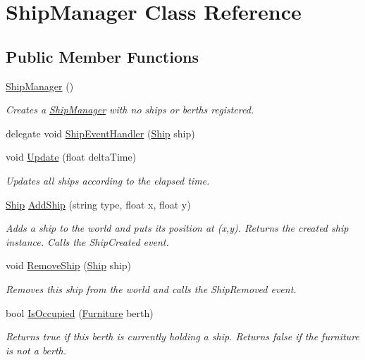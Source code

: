 \hypertarget{class_ship_manager}{}\section{Ship\+Manager Class Reference}
\label{class_ship_manager}
\subsection*{Public Member Functions}
\begin{DoxyCompactItemize}
\item 
\hyperlink{class_ship_manager_ac66c77a24cd7fe00ef4083a5eed322ac}{Ship\+Manager} ()
\begin{DoxyCompactList}\small\item\em Creates a \hyperlink{class_ship_manager}{Ship\+Manager} with no ships or berths registered. \end{DoxyCompactList}\item 
delegate void \hyperlink{class_ship_manager_a9dbbc387497ab2f4fc7c90cde65dfd4d}{Ship\+Event\+Handler} (\hyperlink{class_ship}{Ship} ship)
\item 
void \hyperlink{class_ship_manager_a4f54aabd64ef5b7e366e9dcbcffb1151}{Update} (float delta\+Time)
\begin{DoxyCompactList}\small\item\em Updates all ships according to the elapsed time. \end{DoxyCompactList}\item 
\hyperlink{class_ship}{Ship} \hyperlink{class_ship_manager_a5251a3f11c3d47796f97a541a1ed4c44}{Add\+Ship} (string type, float x, float y)
\begin{DoxyCompactList}\small\item\em Adds a ship to the world and puts its position at (x,y). Returns the created ship instance. Calls the Ship\+Created event. \end{DoxyCompactList}\item 
void \hyperlink{class_ship_manager_a8a9fa6ebfb1f8f059f1776d620658808}{Remove\+Ship} (\hyperlink{class_ship}{Ship} ship)
\begin{DoxyCompactList}\small\item\em Removes this ship from the world and calls the Ship\+Removed event. \end{DoxyCompactList}\item 
bool \hyperlink{class_ship_manager_a1a97c84b3ac0c958fbf1f11f9d04d16b}{Is\+Occupied} (\hyperlink{class_furniture}{Furniture} berth)
\begin{DoxyCompactList}\small\item\em Returns true if this berth is currently holding a ship. Returns false if the furniture is not a berth. \end{DoxyCompactList}\item 

\end{DoxyCompactItemize}
